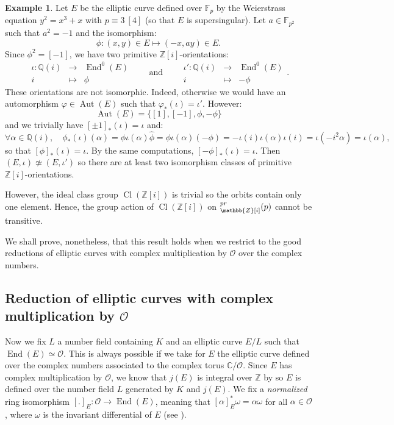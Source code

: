 \documentclass[a4paper,10pt]{report}
\theoremstyle{definition}
\theoremstyle{plain}
\theoremstyle{definition}
\newtheorem{Example}[Definition]{Example}
\newcommand{\Z}{\mathbb{Z}}
\newcommand{\Q}{\mathbb{Q}}
\newcommand{\C}{\mathbb{C}}
\newcommand{\F}{\mathbb{F}}
\newcommand{\mO}{\mathcal{O}}
\renewcommand{\(}{\left(}
\renewcommand{\)}{\right)}
\DeclareMathOperator{\End}{End}
\DeclareMathOperator{\Aut}{Aut}
\DeclareMathOperator{\Cl}{Cl}
\let\SS\relax
\DeclareMathOperator{\SS}{SS}
\begin{document}
\begin{Example}\label{Example 1}
Let $E$ be the elliptic curve defined over $\F_p$ by the Weierstrass equation $y^2=x^3+x$ with $p\equiv 3 \ [4]$ (so that $E$ is supersingular).  Let $a\in\F_{p^2}$ such that $a^2=-1$ and the isomorphism:
\[\phi : (x,y)\in E \longmapsto (-x,ay)\in E.\]
Since $\phi^2=[-1]$,  we have two primitive $\Z[i]$-orientations:
\[\begin{array}{rcl}
\iota : \Q(i) & \longrightarrow & \End^0(E)\\
i & \longmapsto & \phi
\end{array} 
\qquad \mbox{and} \qquad
 \begin{array}{rcl}
\iota' : \Q(i) & \longrightarrow & \End^0(E)\\
i & \longmapsto & -\phi
\end{array}.\]
These orientations are not isomorphic.  Indeed,  otherwise we would have an automorphism $\varphi\in\Aut(E)$ such that $\varphi_*(\iota)=\iota'$.  However:
\[\Aut(E)=\{[1],[-1],\phi,-\phi\}\]
and we trivially have $[\pm 1]_*(\iota)=\iota$ and:
\[\forall \alpha\in \Q(i), \quad \phi_*(\iota)(\alpha)=\phi\iota(\alpha)\widehat{\phi}=\phi\iota(\alpha)(-\phi)=-\iota(i)\iota(\alpha)\iota(i)=\iota(-i^2\alpha)=\iota(\alpha),\]
so that $[\phi]_*(\iota)=\iota$.  By the same computations,  $[-\phi]_*(\iota)=\iota$.  Then $(E,\iota)\not\simeq (E,\iota')$ so there are at least two isomorphism classes of primitive $\Z[i]$-orientations.  

However,  the ideal class group $\Cl(\Z[i])$ is trivial so the orbits contain only one element.  Hence,  the group action of $\Cl(\Z[i])$ on $\SS_{\Z[i]}^{pr}(p)$ cannot be transitive.
\end{Example}

We shall prove,  nonetheless,  that this result holds when we restrict to the good reductions of elliptic curves with complex multiplication by $\mO$ over the complex numbers. 

\subsection{Reduction of elliptic curves with complex multiplication by $\mO$}

Now we fix $L$ a number field containing $K$ and an elliptic curve $E/L$ such that $\End(E)\simeq \mO$. This is always possible if we take for $E$ the elliptic curve defined over the complex numbers associated to the complex torus $\C/\mO$.  Since $E$ has complex multiplication by $\mO$,  we know that $j(E)$ is integral over $\Z$ by \cite[Theorem II.6.1]{Silverman2} so $E$ is defined over the number field $L$ generated by $K$ and $j(E)$.  We fix a \emph{normalized} ring isomorphism $[.]_E:\mO\longrightarrow \End(E)$,  meaning that $[\alpha]_E^*\omega=\alpha\omega$ for all $\alpha\in\mO$,  where $\omega$ is the invariant differential of $E$ (see \cite[Proposition II.1.1]{Silverman2}). 
\end{document}
